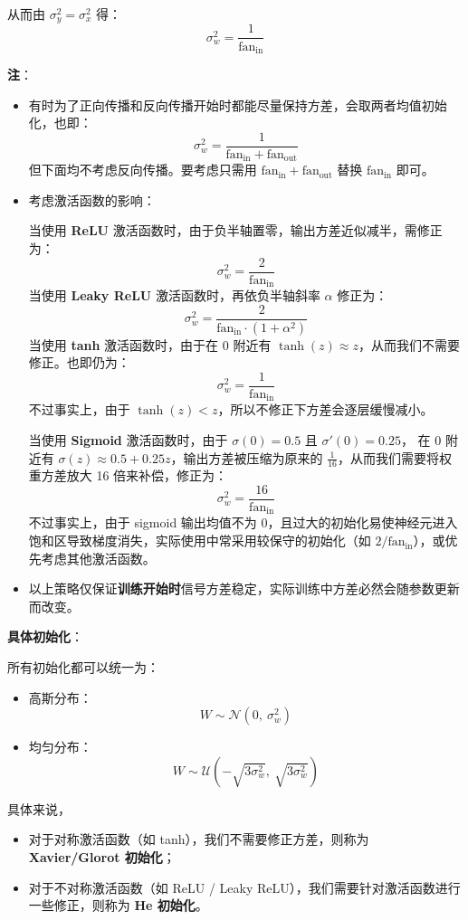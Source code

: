 从而由 $\sigma_y^2 = \sigma_x^2$ 得：
\[
\sigma_w^2 = \frac{1}{\text{fan}_{\text{in}}}
\]

\textbf{注}：

\begin{itemize}
\tightlist
\item
  有时为了正向传播和反向传播开始时都能尽量保持方差，会取两者均值初始化，也即：
  \[
    \sigma_w^2 = \frac{1}{\text{fan}_{\text{in}} + \text{fan}_{\text{out}}}
  \]
  但下面均不考虑反向传播。要考虑只需用
  $\text{fan}_{\text{in}} + \text{fan}_{\text{out}}$ 替换 $\text{fan}_{\text{in}}$ 即可。
\item
  考虑激活函数的影响：

  当使用 \textbf{ReLU}
  激活函数时，由于负半轴置零，输出方差近似减半，需修正为： \[
    \sigma_w^2 = \frac{2}{\text{fan}_\text{in}}
    \] 当使用 \textbf{Leaky ReLU} 激活函数时，再依负半轴斜率 $
  \alpha $ 修正为： \[
    \sigma_w^2 = \frac{2}{\text{fan}_\text{in} \cdot (1+\alpha^2)}
    \] 当使用 \textbf{tanh} 激活函数时，由于在 0 附近有
  \(\tanh(z) \approx z\)，从而我们不需要修正。也即仍为： \[
    \sigma_w^2 = \frac{1}{\text{fan}_\text{in}}
    \] 不过事实上，由于
  \(\tanh(z) < z\)，所以不修正下方差会逐层缓慢减小。

  当使用 \textbf{Sigmoid} 激活函数时，由于 \(\sigma(0) = 0.5\) 且
  \(\sigma'(0) = 0.25\)， 在 0 附近有
  \(\sigma(z) \approx 0.5 + 0.25z\)，输出方差被压缩为原来的
  \(\frac{1}{16}\)，从而我们需要将权重方差放大 16 倍来补偿，修正为： \[
    \sigma_w^2 = \frac{16}{\text{fan}_\text{in}}
    \] 不过事实上，由于 sigmoid 输出均值不为
  0，且过大的初始化易使神经元进入饱和区导致梯度消失，实际使用中常采用较保守的初始化（如
  \(2/\text{fan}_\text{in}\)），或优先考虑其他激活函数。
\item
  以上策略仅保证\textbf{训练开始时}信号方差稳定，实际训练中方差必然会随参数更新而改变。
\end{itemize}

\textbf{具体初始化}：

所有初始化都可以统一为：

\begin{itemize}
\tightlist
\item
  高斯分布： \[
    W \sim \mathcal{N}(0,\ \sigma_w^2)
    \]
\item
  均匀分布： \[
    W \sim \mathcal{U}\left(-\sqrt{3\sigma_w^2},\ \sqrt{3\sigma_w^2}\right)
    \]
\end{itemize}

具体来说，

\begin{itemize}
\tightlist
\item
  对于对称激活函数（如 tanh），我们不需要修正方差，则称为
  \textbf{Xavier/Glorot 初始化}；
\item
  对于不对称激活函数（如 ReLU / Leaky
  ReLU），我们需要针对激活函数进行一些修正，则称为 \textbf{He 初始化}。
\end{itemize}

